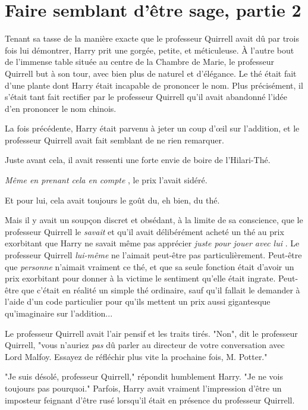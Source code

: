 
\chapter{Faire semblant d'être sage, partie 2}

Tenant sa tasse de la manière exacte que le professeur Quirrell avait dû par trois fois lui démontrer, Harry prit une gorgée, petite, et méticuleuse. À l'autre bout de l'immense table située au centre de la Chambre de Marie, le professeur Quirrell but à son tour, avec bien plus de naturel et d'élégance. Le thé était fait d'une plante dont Harry était incapable de prononcer le nom. Plus précisément, il s'était tant fait rectifier par le professeur Quirrell qu'il avait abandonné l'idée d'en prononcer le nom chinois.

La fois précédente, Harry était parvenu à jeter un coup d'œil sur l'addition, et le professeur Quirrell avait fait semblant de ne rien remarquer.

Juste avant cela, il avait ressenti une forte envie de boire de l'Hilari-Thé.

\emph{Même en prenant cela en compte} , le prix l'avait sidéré.

Et pour lui, cela avait toujours le goût du, eh bien, du thé.

Mais il y avait un soupçon discret et obsédant, à la limite de sa conscience, que le professeur Quirrell le \emph{savait}  et qu'il avait délibérément acheté un thé au prix exorbitant que Harry ne savait même pas apprécier \emph{juste pour jouer avec lui} . Le professeur Quirrell \emph{lui-même}  ne l'aimait peut-être pas particulièrement. Peut-être que \emph{personne}  n'aimait vraiment ce thé, et que sa seule fonction était d'avoir un prix exorbitant pour donner à la victime le sentiment qu'elle était ingrate. Peut-être que c'était en réalité un simple thé ordinaire, sauf qu'il fallait le demander à l'aide d'un code particulier pour qu'ils mettent un prix aussi gigantesque qu'imaginaire sur l'addition...

Le professeur Quirrell avait l'air pensif et les traits tirés. "Non", dit le professeur Quirrell, "vous n'auriez \emph{pas}  dû parler au directeur de votre conversation avec Lord Malfoy. Essayez de réfléchir plus vite la prochaine fois, M. Potter."

"Je suis désolé, professeur Quirrell," répondit humblement Harry. "Je ne vois toujours pas pourquoi." Parfois, Harry avait vraiment l'impression d'être un imposteur feignant d'être rusé lorsqu'il était en présence du professeur Quirrell.

